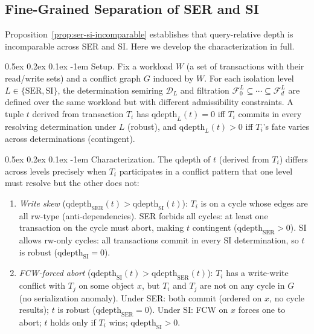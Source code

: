 \documentclass[acmsmall,review,anonymous]{acmart}
\makeatletter
\renewcommand{\paragraph}{\@startsection{paragraph}{4}{\z@}%
  {0.5ex \@plus 0.2ex \@minus 0.1ex}%
  {-1em}%
  {\normalfont\normalsize\bfseries}}
\theoremstyle{remark}
\numberwithin{definition}{section}
\numberwithin{theorem}{section}
\numberwithin{lemma}{section}
\numberwithin{corollary}{section}
\numberwithin{remark}{section}
\numberwithin{example}{section}
\numberwithin{observation}{section}
\numberwithin{assumption}{section}
\makeatother
\begin{document}
\subsection{Fine-Grained Separation of SER and SI}
\label{app:ser-si-separation}

Proposition~\ref{prop:ser-si-incomparable} establishes that
query-relative depth is incomparable across SER and SI.
Here we develop the characterization in full.

\paragraph{Setup.}
Fix a workload $W$ (a set of transactions with their read/write sets)
and a conflict graph $G$ induced by $W$.
For each isolation level $L \in \{\mathrm{SER}, \mathrm{SI}\}$, the
determination semiring $\mathcal{D}_L$ and filtration
$\mathcal{F}^L_0 \subseteq \cdots \subseteq \mathcal{F}^L_d$ are
defined over the same workload but with different admissibility
constraints.
A tuple $t$ derived from transaction $T_i$ has
$\mathrm{qdepth}_L(t) = 0$ iff $T_i$ commits in every resolving
determination under $L$ (robust), and $\mathrm{qdepth}_L(t) > 0$ iff
$T_i$'s fate varies across determinations (contingent).

\paragraph{Characterization.}
The qdepth of $t$ (derived from $T_i$) differs across levels precisely
when $T_i$ participates in a conflict pattern that one level must
resolve but the other does not:

\begin{enumerate}[label=(\alph*),nosep]
  \item \emph{Write skew} ($\mathrm{qdepth}_{\mathrm{SER}}(t) >
        \mathrm{qdepth}_{\mathrm{SI}}(t)$):
        $T_i$ is on a cycle whose edges are all rw-type (anti-dependencies).
        SER forbids all cycles: at least one transaction on the cycle
        must abort, making $t$ contingent ($\mathrm{qdepth}_{\mathrm{SER}} > 0$).
        SI allows rw-only cycles: all transactions commit in every SI
        determination, so $t$ is robust ($\mathrm{qdepth}_{\mathrm{SI}} = 0$).

  \item \emph{FCW-forced abort} ($\mathrm{qdepth}_{\mathrm{SI}}(t) >
        \mathrm{qdepth}_{\mathrm{SER}}(t)$):
        $T_i$ has a write-write conflict with $T_j$ on some object $x$,
        but $T_i$ and $T_j$ are not on any cycle in $G$ (no
        serialization anomaly).
        Under SER: both commit (ordered on $x$, no cycle results);
        $t$ is robust ($\mathrm{qdepth}_{\mathrm{SER}} = 0$).
        Under SI: FCW on $x$ forces one to abort; $t$ holds only if
        $T_i$ wins; $\mathrm{qdepth}_{\mathrm{SI}} > 0$.
\end{enumerate}
\end{document}

